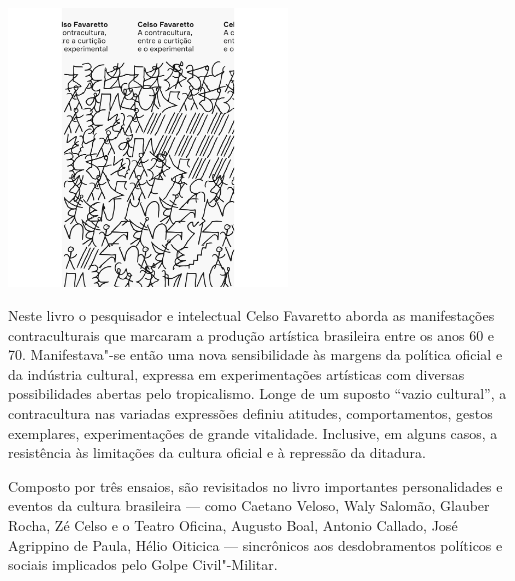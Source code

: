 \pagebreak %


\begin{center}
\hspace*{.5cm}\includegraphics[width=74mm]{./grid/favaretto.png}
\end{center}

\hspace*{-7cm}\hrulefill\hspace*{-7cm}

\medskip

\noindent{}Neste livro o pesquisador e intelectual Celso Favaretto aborda as manifestações contraculturais que marcaram a produção artística brasileira entre os anos 60 e 70. Manifestava"-se então uma nova sensibilidade às margens da política oficial e da indústria cultural, expressa em experimentações artísticas com diversas possibilidades abertas pelo tropicalismo. Longe de um suposto “vazio cultural”, a contracultura nas variadas expressões definiu atitudes, comportamentos, gestos exemplares, experimentações de grande vitalidade. Inclusive, em alguns casos, a resistência às limitações da cultura oficial e à repressão da ditadura.

Composto por três ensaios, são revisitados no livro importantes personalidades e eventos da cultura brasileira --- como Caetano Veloso, Waly Salomão, Glauber Rocha, Zé Celso e o Teatro Oficina, Augusto Boal, Antonio Callado, José Agrippino de Paula, Hélio Oiticica --- sincrônicos aos desdobramentos políticos e sociais implicados pelo Golpe Civil"-Militar.

\vfill

\hspace*{-.4cm}\begin{minipage}[c]{.5\linewidth}
\small{
{}}
\end{minipage}

